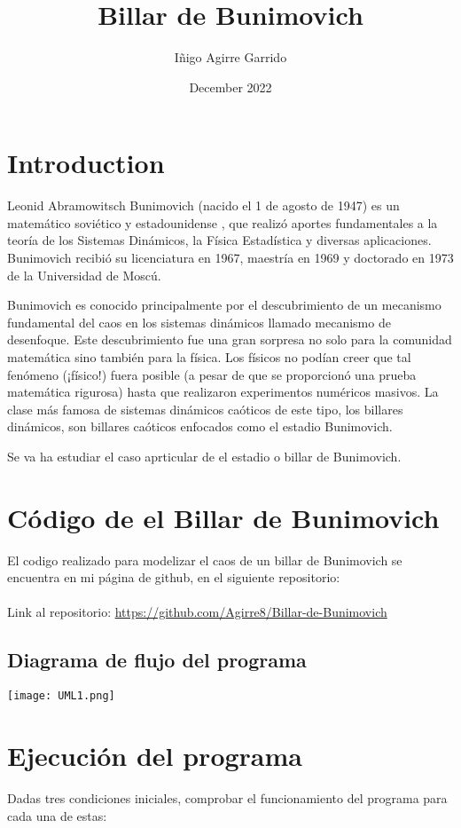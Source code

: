 \documentclass{article}
\title{Billar de Bunimovich}
\author{Iñigo Agirre Garrido}
\date{December 2022}
\begin{document}
\maketitle

\section{Introduction}
Leonid Abramowitsch Bunimovich (nacido el 1 de agosto de 1947) es un matemático soviético y estadounidense , que realizó aportes fundamentales a la teoría de los Sistemas Dinámicos, la Física Estadística y diversas aplicaciones. Bunimovich recibió su licenciatura en 1967, maestría en 1969 y doctorado en 1973 de la Universidad de Moscú.

Bunimovich es conocido principalmente por el descubrimiento de un mecanismo fundamental del caos en los sistemas dinámicos llamado mecanismo de desenfoque. Este descubrimiento fue una gran sorpresa no solo para la comunidad matemática sino también para la física. Los físicos no podían creer que tal fenómeno (¡físico!) fuera posible (a pesar de que se proporcionó una prueba matemática rigurosa) hasta que realizaron experimentos numéricos masivos. La clase más famosa de sistemas dinámicos caóticos de este tipo, los billares dinámicos, son billares caóticos enfocados como el estadio Bunimovich.

Se va ha estudiar el caso aprticular de el estadio o billar de Bunimovich.

\section{Código de el Billar de Bunimovich}

El codigo realizado para modelizar el caos de un billar de Bunimovich se encuentra en mi página de github, en el siguiente repositorio:\\
\\
Link al repositorio: \url{https://github.com/Agirre8/Billar-de-Bunimovich}

\subsection{Diagrama de flujo del programa}
\begin{center}
        \texttt{[image: UML1.png]}
\end{center}
\newpage

\section{Ejecución del programa}
Dadas tres condiciones iniciales, comprobar el funcionamiento del programa para cada una de estas:
\\
\end{document}
